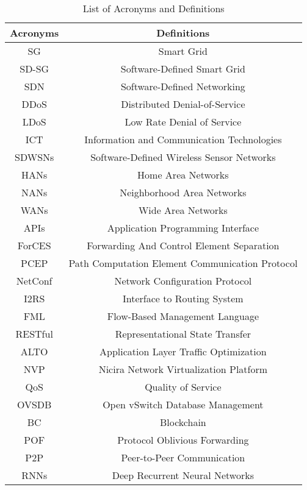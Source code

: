 \documentclass[conference]{IEEEtran}
\begin{document}
\begin{table}[ht]

\centering
\caption{ List of Acronyms and Definitions}

\begin{tabular}{|c|c|}

 \hline
 \label{Acrynonyms_Definitions}
 \textbf{Acronyms} & \textbf{Definitions} \\
 \hline
 SG & Smart Grid \\ \hline
 SD-SG & Software-Defined Smart Grid  \\ \hline
 SDN   & Software-Defined Networking   \\ \hline
 DDoS & Distributed Denial-of-Service \\ \hline
 LDoS & Low Rate Denial of Service \\ \hline
 ICT & Information and Communication Technologies \\ \hline
 SDWSNs & Software-Defined Wireless Sensor Networks  \\ \hline
 HANs & Home Area Networks \\ \hline
 NANs & Neighborhood Area Networks \\ \hline
 WANs & Wide Area Networks \\ \hline
 APIs & Application Programming Interface \\ \hline
 ForCES & Forwarding And Control Element Separation \\ \hline
 PCEP & Path Computation Element Communication Protocol \\ \hline
 NetConf & Network Configuration Protocol \\ \hline
 I2RS & Interface to Routing System \\ \hline
 FML & Flow-Based Management Language \\ \hline
 RESTful & Representational State Transfer \\ \hline
 ALTO & Application Layer Traffic Optimization \\ \hline
 NVP & Nicira Network Virtualization Platform  \\ \hline
QoS & Quality of Service \\ \hline
OVSDB &  Open vSwitch Database Management \\ \hline
BC & Blockchain \\ \hline
POF  & Protocol Oblivious Forwarding \\ \hline
P2P & Peer-to-Peer Communication \\ \hline
RNNs & Deep Recurrent Neural Networks \\ \hline

\end{tabular}
\end{table}
\end{document}
